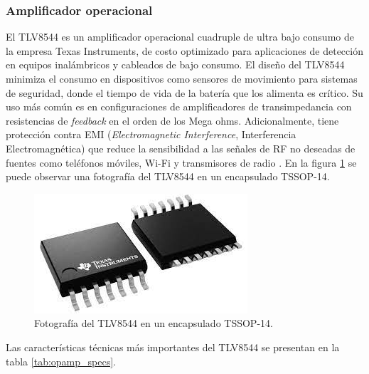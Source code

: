 \subsubsection{Amplificador operacional}
El TLV8544 es un amplificador operacional cuadruple de ultra bajo consumo de la empresa Texas Instruments, de costo optimizado para aplicaciones de detección en equipos inalámbricos y cableados de bajo consumo. El diseño del TLV8544 minimiza el consumo en dispositivos como sensores de movimiento para sistemas de seguridad, donde el tiempo de vida de la batería que los alimenta es crítico. Su uso más común es en configuraciones de amplificadores de transimpedancia con resistencias de \textit{feedback} en el orden de los Mega ohms. Adicionalmente, tiene protección contra EMI (\textit{Electromagnetic Interference}, Interferencia Electromagnética) que reduce la sensibilidad a las señales de RF no deseadas de fuentes como teléfonos móviles, Wi-Fi y transmisores de radio \cite{opamp_info}. En la figura \ref{fig:opamp_photo} se puede observar una fotografía del TLV8544 en un encapsulado TSSOP-14.

\vspace*{50 px}

\begin{figure}[h]
	\centering
	\includegraphics[scale=0.4]{./Figures/opamp_photo.jpeg}
	\caption{Fotografía del TLV8544 en un encapsulado TSSOP-14\protect\footnotemark.}
	\label{fig:opamp_photo}
\end{figure}

Las características técnicas más importantes del TLV8544 se presentan en la tabla \ref{tab:opamp_specs}.

